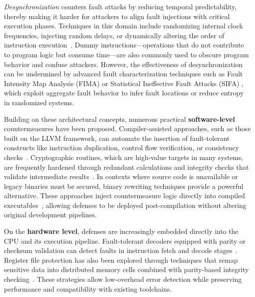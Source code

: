 \textit{Desynchronization} counters fault attacks by reducing temporal predictability, thereby making it harder for attackers to align fault injections with critical execution phases. Techniques in this domain include randomizing internal clock frequencies, injecting random delays, or dynamically altering the order of instruction execution~\cite{patrick2017lightweight, wang2016against}. Dummy instructions—operations that do not contribute to program logic but consume time—are also commonly used to obscure program behavior and confuse attackers. However, the effectiveness of desynchronization can be undermined by advanced fault characterization techniques such as Fault Intensity Map Analysis (FIMA) \cite{ramezanpour2019fima} or Statistical Ineffective Fault Attacks (SIFA) \cite{dobraunig2018statistical}, which exploit aggregate fault behavior to infer fault locations or reduce entropy in randomized systems.

Building on these architectural concepts, numerous practical \textbf{software-level} countermeasures have been proposed. Compiler-assisted approaches, such as those built on the LLVM framework, can automate the insertion of fault-tolerant constructs like instruction duplication, control flow verification, or consistency checks~\cite{Barry2016}. Cryptographic routines, which are high-value targets in many systems, are frequently hardened through redundant calculations and integrity checks that validate intermediate results~\cite{Barenghi2010}. In contexts where source code is unavailable or legacy binaries must be secured, binary rewriting techniques provide a powerful alternative. These approaches inject countermeasure logic directly into compiled executables~\cite{Kiaei2021}, allowing defenses to be deployed post-compilation without altering original development pipelines.

On the \textbf{hardware level}, defenses are increasingly embedded directly into the CPU and its execution pipeline. Fault-tolerant decoders equipped with parity or checksum validation can detect faults in instruction fetch and decode stages~\cite{Shukla2023}. Register file protection has also been explored through techniques that remap sensitive data into distributed memory cells combined with parity-based integrity checking~\cite{Ramos2018}. These strategies allow low-overhead error detection while preserving performance and compatibility with existing toolchains.

